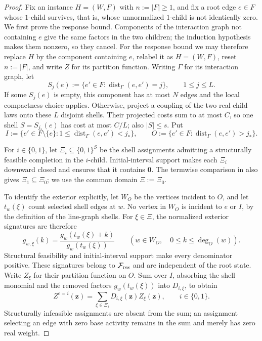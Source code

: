 \documentclass[11pt,reqno]{article}
\theoremstyle{plain}
\theoremstyle{definition}
\theoremstyle{remark}
\theoremstyle{definition}
\theoremstyle{remark}
\newcommand{\dist}{\operatorname{dist}}
\begin{document}
\begin{proof}
Fix an instance \(H=(W,F)\) with \(n:=|F|\ge1\), and fix a root edge
\(e\in F\) whose \(1\)-child survives, that is, whose unnormalized
\(1\)-child is not identically zero.  We first prove the response bound.
Components of the interaction graph not containing \(e\) give
the same factors in the two children; the induction hypothesis makes
them nonzero, so they cancel.  For the response bound we may therefore
replace \(H\) by the
component containing \(e\), relabel it as \(H=(W,F)\), reset
\(n:=|F|\), and write \(Z\) for its partition function.  Writing
\(\Gamma\) for its interaction graph, let
\[
  S_j(e):=\{e'\in F:\dist_{\Gamma}(e,e')=j\},
  \qquad 1\le j\le L.
\]
If some \(S_j(e)\) is empty, this component has at most \(N\) edges and
the local compactness choice applies.  Otherwise, project a coupling of
the two real child laws onto these \(L\) disjoint shells.  Their projected
costs sum to at most \(C\), so one shell \(S=S_{j_*}(e)\) has cost at
most \(C/L\); also \(|S|\le s\).  Put
\[
  I:=\{e'\in F\setminus\{e\}:1\le\dist_{\Gamma}(e,e')<j_*\},
  \qquad
  O:=\{e'\in F:\dist_{\Gamma}(e,e')>j_*\}.
\]

For \(i\in\{0,1\}\), let \(\Xi_i\subseteq\{0,1\}^S\) be the shell
assignments admitting a structurally feasible completion in the
\(i\)-child.
Initial-interval support makes each \(\Xi_i\) downward closed and
ensures that it contains \(\mathbf0\).  The termwise comparison in
 also gives \(\Xi_1\subseteq\Xi_0\);
we use the common domain \(\Xi:=\Xi_0\).

To identify the exterior explicitly, let \(W_O\) be the vertices incident
to \(O\), and let \(t_w(\xi)\) count selected shell edges at \(w\).
No vertex in \(W_O\) is incident to \(e\) or \(I\), by the definition
of the line-graph shells.  For \(\xi\in\Xi\), the normalized exterior
signatures are therefore
\[
  g_{w,\xi}(k)=\frac{g_w(t_w(\xi)+k)}{g_w(t_w(\xi))}
  \qquad(w\in W_O,\quad 0\le k\le\deg_O(w)).
\]
Structural feasibility and initial-interval support make every denominator
positive.  These signatures belong to \(\mathcal F_{\rm res}\) and are
independent of the root state.  Write \(Z_\xi\) for their partition
function on \(O\).  Sum over \(I\), absorbing the shell monomial and
the removed factors \(g_w(t_w(\xi))\) into \(D_{i,\xi}\), to obtain
\[
  Z^{e=i}(\mathbf z)
  =\sum_{\xi\in\Xi_i}D_{i,\xi}(\mathbf z)Z_\xi(\mathbf z),
  \qquad i\in\{0,1\}.
\]
Structurally infeasible
assignments are absent from the sum; an assignment selecting an edge with
zero base activity remains in
the sum and merely has zero real weight.


\end{proof}
\end{document}
